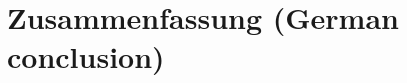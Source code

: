 \documentclass[12pt, a4paper, titlepage, oneside, abstract=true, toc=listof, toc=bibliography]{scrreprt}
\begin{document}
{%
\chapter{Zusammenfassung (German conclusion)}

 
\cleardoublepage			

%


\printglossary[type=software]

\cleardoublepage

\begin{appendices}
\appendixpage


\end{appendices}}
\end{document}
